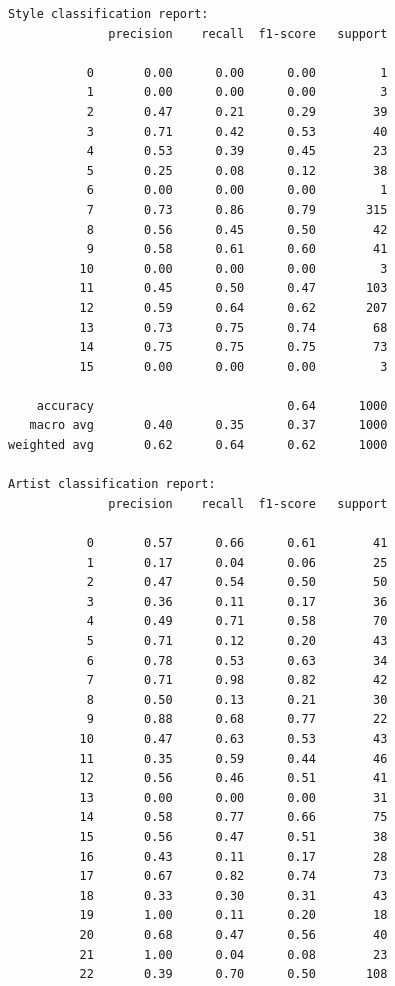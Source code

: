 \documentclass[11pt]{article}
\begin{document}
    
    \begin{Verbatim}[commandchars=\\\{\}]
Style classification report:
              precision    recall  f1-score   support

           0       0.00      0.00      0.00         1
           1       0.00      0.00      0.00         3
           2       0.47      0.21      0.29        39
           3       0.71      0.42      0.53        40
           4       0.53      0.39      0.45        23
           5       0.25      0.08      0.12        38
           6       0.00      0.00      0.00         1
           7       0.73      0.86      0.79       315
           8       0.56      0.45      0.50        42
           9       0.58      0.61      0.60        41
          10       0.00      0.00      0.00         3
          11       0.45      0.50      0.47       103
          12       0.59      0.64      0.62       207
          13       0.73      0.75      0.74        68
          14       0.75      0.75      0.75        73
          15       0.00      0.00      0.00         3

    accuracy                           0.64      1000
   macro avg       0.40      0.35      0.37      1000
weighted avg       0.62      0.64      0.62      1000

Artist classification report:
              precision    recall  f1-score   support

           0       0.57      0.66      0.61        41
           1       0.17      0.04      0.06        25
           2       0.47      0.54      0.50        50
           3       0.36      0.11      0.17        36
           4       0.49      0.71      0.58        70
           5       0.71      0.12      0.20        43
           6       0.78      0.53      0.63        34
           7       0.71      0.98      0.82        42
           8       0.50      0.13      0.21        30
           9       0.88      0.68      0.77        22
          10       0.47      0.63      0.53        43
          11       0.35      0.59      0.44        46
          12       0.56      0.46      0.51        41
          13       0.00      0.00      0.00        31
          14       0.58      0.77      0.66        75
          15       0.56      0.47      0.51        38
          16       0.43      0.11      0.17        28
          17       0.67      0.82      0.74        73
          18       0.33      0.30      0.31        43
          19       1.00      0.11      0.20        18
          20       0.68      0.47      0.56        40
          21       1.00      0.04      0.08        23
          22       0.39      0.70      0.50       108


\end{Verbatim}
\end{document}
